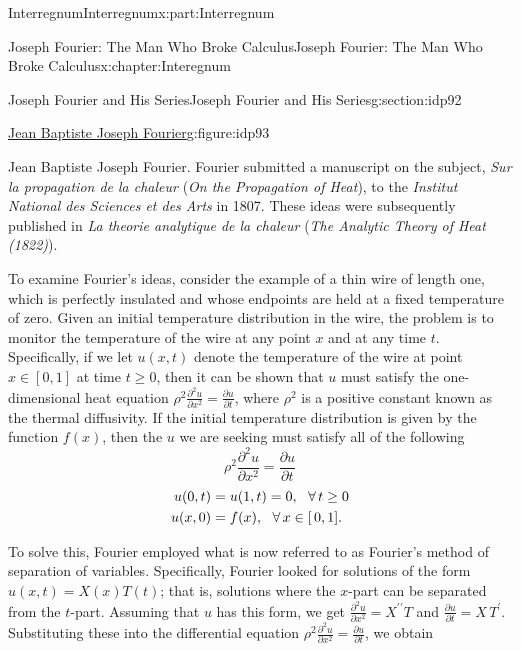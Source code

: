 \begin{partptx}{Interregnum}{}{Interregnum}{}{}{x:part:Interregnum}
\begin{chapterptx}{Joseph Fourier: The Man Who Broke Calculus}{}{Joseph Fourier: The Man Who Broke Calculus}{}{}{x:chapter:Interegnum}
\begin{sectionptx}{Joseph Fourier and His Series}{}{Joseph Fourier and His Series}{}{}{g:section:idp92}
\begin{figureptx}{\href{https://mathshistory.st-andrews.ac.uk/Biographies/Fourier/}{Jean Baptiste Joseph Fourier}\protect\footnotemark{}}{g:figure:idp93}{}
\begin{image}{0.325}{0.35}{0.325}
				\end{image}%
				\tcblower
			\end{figureptx}%
			 Jean Baptiste Joseph Fourier.  Fourier submitted a manuscript on the subject, \textit{Sur la propagation de la chaleur} (\emph{On the Propagation of Heat}), to the \textit{Institut National des Sciences et des Arts} in 1807.  These ideas were subsequently published in \textit{La theorie analytique de la chaleur} (\emph{The Analytic Theory of Heat (1822)}).%
			\par
			To examine Fourier's ideas, consider the example of a thin wire of length one, which is perfectly insulated and whose endpoints are held at a fixed temperature of zero. Given an initial temperature distribution in the wire, the problem is to monitor the temperature of the wire at any point \(x\) and at any time \(t\). Specifically, if we let \(u(x,t)\) denote the temperature of the wire at point \(x\in[0,1]\) at time \(t\geq 0\), then it can be shown that \(u\) must satisfy the one-dimensional heat equation \(\rho^2\frac{\partial^2u}{\partial x^2}=\frac{\partial u}{\partial t}\), where \(\rho^2\) is a positive constant known as the thermal diffusivity. If the initial temperature distribution is given by the function \(f(x)\), then the \(u\) we are seeking must satisfy all of the following%
			\begin{equation*}
				\rho^2\frac{\partial^2u}{\partial x^2}=\frac{\partial u}{\partial t}
			\end{equation*}
			\begin{align*}
				u(0,t)& =u(1,t)=0,\ \ \forall\,t\geq 0\\
				u(x,0)& =f(x),\ \ \forall\,x\in[\,0,1]\text{.}
			\end{align*}
			\par
			To solve this, Fourier employed what is now referred to as Fourier's method of separation of variables. Specifically, Fourier looked for solutions of the form \(u(x,t)=X(x)T(t)\); that is, solutions where the \(x\)-part can be separated from the \(t\)-part. Assuming that \(u\) has this form, we get \(\frac{\partial^2u}{\partial x^2}=X^{\prime\prime}T\) and \(\frac{\partial u}{\partial t}=X\,T^{\prime}\). Substituting these into the differential equation \(\rho^2\frac{\partial^2u}{\partial x^2}=\frac{\partial u}{\partial t}\), we obtain%
			\begin{equation*}

\end{equation*}
\end{sectionptx}
\end{chapterptx}
\end{partptx}
